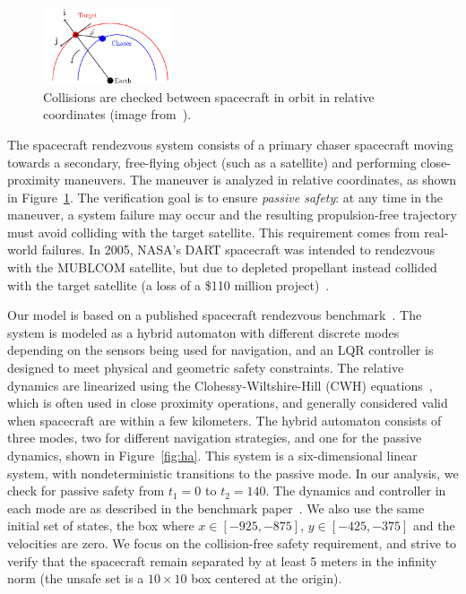 %

\begin{figure}
\includegraphics[width=0.34\textwidth]{images/chaser.png}
\caption{Collisions are checked between spacecraft in orbit in relative coordinates (image from~\cite{chan2017verifying}).}
\label{fig:chaser}
\end{figure}
The spacecraft rendezvous system consists of a primary chaser spacecraft moving towards a secondary, free-flying object (such as a satellite) and
performing close-proximity maneuvers.
%
The maneuver is analyzed in relative coordinates, as shown in Figure~\ref{fig:chaser}.
%
The verification goal is to ensure \emph{passive safety}: at any time in the maneuver, a system failure may occur and the resulting propulsion-free trajectory must avoid colliding with the target satellite.
%
This requirement comes from real-world failures. In 2005, NASA's DART spacecraft was intended to rendezvous with the MUBLCOM satellite, but due to depleted propellant instead collided with the target satellite (a loss of a
\$110 million project)~\cite{croomes2006overview}.


Our model is based on a published spacecraft rendezvous benchmark~\cite{chan2017verifying,jewison2016spacecraft}.
%
The system is modeled as a hybrid automaton with different discrete modes depending on the sensors being used for navigation, and an LQR controller is designed to meet physical and geometric safety constraints.
%
The relative dynamics are linearized using the Clohessy-Wiltshire-Hill (CWH) equations~\cite{wh1960terminal},
which is often used in close proximity operations, and generally considered valid when spacecraft are within a few kilometers.
%
The hybrid automaton consists of three modes, two for different navigation strategies, and one for the passive dynamics, shown in Figure~\ref{fig:ha}.
%
This system is a six-dimensional linear system, with nondeterministic transitions to the passive mode.
%
In our analysis, we check for passive safety from $t_1=0$ to $t_2=140$.
%
The dynamics and controller in each mode are as described in the benchmark paper~\cite{chan2017verifying}.
%
We also use the same initial set of states, the box where $x \in [-925, -875]$, $y \in [-425, -375]$ and the velocities are zero.
%
We focus on the collision-free safety requirement, and strive to verify that the spacecraft remain separated by at least
5 meters in the infinity norm (the unsafe set is a $10 \times 10$ box centered at the origin).


